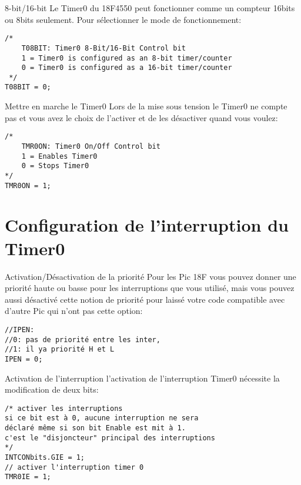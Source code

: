 \documentclass[french]{beamer}
\newcommand\justifyit{\rightskip0pt \leftskip0pt}
\begin{document}
\begin{frame}[fragile]{8-bit/16-bit}
\justifyit
Le Timer0 du 18F4550 peut fonctionner comme un compteur 16bits ou 8bits seulement.
Pour sélectionner le mode de fonctionnement:
\begin{verbatim}
/*
    T08BIT: Timer0 8-Bit/16-Bit Control bit
    1 = Timer0 is configured as an 8-bit timer/counter
    0 = Timer0 is configured as a 16-bit timer/counter
 */
T08BIT = 0;
\end{verbatim}


\end{frame}




\begin{frame}[fragile]{Mettre en marche le Timer0}
\justifyit
Lors de la mise sous tension le Timer0 ne compte pas et vous avez le choix de l'activer et de les désactiver quand vous voulez:
\begin{verbatim}
/*
    TMR0ON: Timer0 On/Off Control bit
    1 = Enables Timer0
    0 = Stops Timer0
*/
TMR0ON = 1;
\end{verbatim}
\end{frame}

\section{Configuration de l'interruption du Timer0}
\begin{frame}[fragile]{Activation/Désactivation de la priorité}
\justifyit
Pour les Pic 18F vous pouvez donner une priorité haute ou basse pour les interruptions
que vous utilisé, mais vous pouvez aussi désactivé cette notion de priorité pour laissé votre code compatible avec d'autre Pic qui n'ont pas cette option:
\begin{verbatim}
//IPEN:
//0: pas de priorité entre les inter,
//1: il ya priorité H et L
IPEN = 0;
\end{verbatim}

\end{frame}

\begin{frame}[fragile]{Activation de l'interruption}
\justifyit
l'activation de l'interruption Timer0 nécessite la modification de deux bits:
\begin{verbatim}
/* activer les interruptions
si ce bit est à 0, aucune interruption ne sera 
déclaré même si son bit Enable est mit à 1.
c'est le "disjoncteur" principal des interruptions
*/ 
INTCONbits.GIE = 1;
// activer l'interruption timer 0
TMR0IE = 1;
\end{verbatim}

\end{frame}
\end{document}
